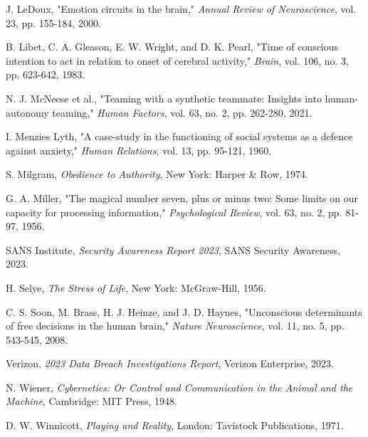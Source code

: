 \documentclass[journal]{IEEEtran}
\begin{document}
\begin{thebibliography}{99}
J. LeDoux, "Emotion circuits in the brain," \textit{Annual Review of Neuroscience}, vol. 23, pp. 155-184, 2000.

B. Libet, C. A. Gleason, E. W. Wright, and D. K. Pearl, "Time of conscious intention to act in relation to onset of cerebral activity," \textit{Brain}, vol. 106, no. 3, pp. 623-642, 1983.

N. J. McNeese et al., "Teaming with a synthetic teammate: Insights into human-autonomy teaming," \textit{Human Factors}, vol. 63, no. 2, pp. 262-280, 2021.

I. Menzies Lyth, "A case-study in the functioning of social systems as a defence against anxiety," \textit{Human Relations}, vol. 13, pp. 95-121, 1960.

S. Milgram, \textit{Obedience to Authority}, New York: Harper \& Row, 1974.

G. A. Miller, "The magical number seven, plus or minus two: Some limits on our capacity for processing information," \textit{Psychological Review}, vol. 63, no. 2, pp. 81-97, 1956.

SANS Institute, \textit{Security Awareness Report 2023}, SANS Security Awareness, 2023.

H. Selye, \textit{The Stress of Life}, New York: McGraw-Hill, 1956.

C. S. Soon, M. Brass, H. J. Heinze, and J. D. Haynes, "Unconscious determinants of free decisions in the human brain," \textit{Nature Neuroscience}, vol. 11, no. 5, pp. 543-545, 2008.

Verizon, \textit{2023 Data Breach Investigations Report}, Verizon Enterprise, 2023.

N. Wiener, \textit{Cybernetics: Or Control and Communication in the Animal and the Machine}, Cambridge: MIT Press, 1948.

D. W. Winnicott, \textit{Playing and Reality}, London: Tavistock Publications, 1971.

\end{thebibliography}
\end{document}
